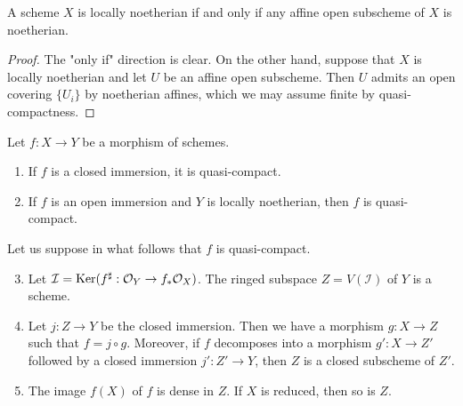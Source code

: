 \begin{exer}
	A scheme $X$ is locally noetherian if and only if any affine open
	subscheme of $X$ is noetherian.
\end{exer}
\begin{proof}
	The "only if" direction is clear. On the other hand, suppose that $X$
	is locally noetherian and let $U$ be an affine open subscheme. Then
	$U$ admits an open covering $\{U_i\}$ by noetherian affines, which we
	may assume finite by quasi-compactness.
\end{proof}

\begin{exer}
	Let $f: X \to Y$ be a morphism of schemes.
	\begin{enumerate}[label=(\alph*)]
		\item If $f$ is a closed immersion, it is quasi-compact.
		\item If $f$ is an open immersion and $Y$ is locally noetherian,
			then $f$ is quasi-compact.
	\end{enumerate}
	Let us suppose in what follows that $f$ is quasi-compact.
	\begin{enumerate}[label=(\alph*)]
		\setcounter{enumi}{2}
		\item Let $\mathcal I = \operatorname{Ker}(f^\sharp: \mathcal{O}_Y \to f_*\mathcal{O}_X)$.
			The ringed subspace $Z = V(\mathcal I)$ of $Y$ is a
			scheme.
		\item Let $j: Z \to Y$ be the closed immersion. Then we have a
			morphism $g: X \to Z$ such that $f = j \circ g$.
			Moreover, if $f$ decomposes into a morphism $g': X \to
			Z'$ followed by a closed immersion $j': Z' \to Y$, then
			$Z$ is a closed subscheme of $Z'$.
		\item The image $f(X)$ of $f$ is dense in $Z$. If $X$ is
			reduced, then so is $Z$.
	\end{enumerate}
\end{exer}

